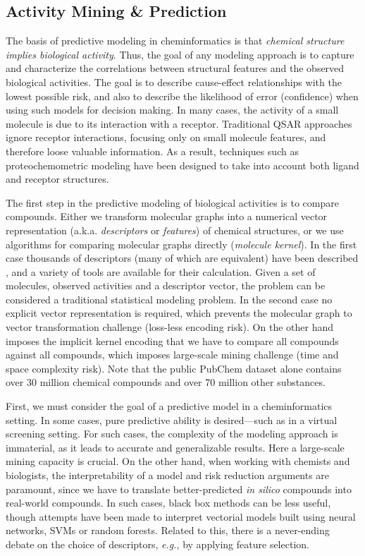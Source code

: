 \documentclass{sig-alternate}
\begin{document}
\subsection{Activity Mining \& Prediction}
\label{sec:activity-mining}


The basis of predictive modeling in cheminformatics is that \emph{chemical structure
implies biological activity}. Thus, the goal of any modeling approach is to
capture and characterize the correlations between structural features and the
observed biological activities. The goal is to describe cause-effect
relationships with the lowest possible risk, and also to describe the
likelihood of error (confidence) when using such models for decision making. In
many cases, the activity of a small molecule is due to its interaction with a
receptor. Traditional QSAR approaches ignore receptor interactions, focusing
only on small molecule features, and therefore loose valuable information. As a
result, techniques such as proteochemometric modeling have been designed
to take into account both ligand and receptor structures.

The first step in the predictive modeling of biological activities is
to compare compounds. Either we transform molecular graphs into a
numerical vector representation (a.k.a. \emph{descriptors} or
\emph{features}) of chemical structures, or we use algorithms for
comparing molecular graphs directly (\emph{molecule kernel}). In the
first case thousands of descriptors (many of which are equivalent)
have been described \cite{todeschini2000},
and a variety of tools are available for their calculation. Given a
set of molecules, observed activities and a descriptor vector, the
problem can be considered a traditional statistical modeling
problem. In the second case no explicit vector representation is
required, which prevents the molecular graph to vector transformation
challenge (loss-less encoding risk). On the other hand imposes the
implicit kernel encoding that we have to compare all compounds against
all compounds, which imposes large-scale mining challenge (time and
space complexity risk). Note that the public PubChem dataset alone
contains over 30 million chemical compounds and over 70 million other
substances.

First, we must consider the goal of a predictive model in a
cheminformatics setting. In some cases, pure predictive ability is
desired---such as in a virtual screening setting. For such cases, the
complexity of the modeling approach is immaterial, as it leads to
accurate and generalizable results. Here a large-scale mining capacity
is crucial. On the other hand, when working with chemists and
biologists, the interpretability of a model and risk reduction
arguments are paramount, since we have to translate better-predicted
\emph{in silico} compounds into real-world compounds. In such cases,
black box methods can be less useful, though attempts have been made
to interpret vectorial models built using neural networks, SVMs or
random forests. Related to this, there is a never-ending debate on the
choice of descriptors, \emph{e.g.}, by applying feature selection.
\end{document}
